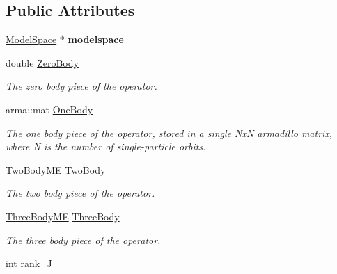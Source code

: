 \subsection*{Public Attributes}
\begin{DoxyCompactItemize}
\item 
\hypertarget{classOperator_af08ef1c6d3ef38d08b4a6ea20b26ef22}{\hyperlink{classModelSpace}{Model\-Space} $\ast$ {\bfseries modelspace}}\label{classOperator_af08ef1c6d3ef38d08b4a6ea20b26ef22}

\item 
\hypertarget{classOperator_a2f9f1109333a2485083cc7c090f9cd26}{double \hyperlink{classOperator_a2f9f1109333a2485083cc7c090f9cd26}{Zero\-Body}}\label{classOperator_a2f9f1109333a2485083cc7c090f9cd26}

\begin{DoxyCompactList}\small\item\em The zero body piece of the operator. \end{DoxyCompactList}\item 
\hypertarget{classOperator_a14b1c78e0be45772aa57168c74d1b57c}{arma\-::mat \hyperlink{classOperator_a14b1c78e0be45772aa57168c74d1b57c}{One\-Body}}\label{classOperator_a14b1c78e0be45772aa57168c74d1b57c}

\begin{DoxyCompactList}\small\item\em The one body piece of the operator, stored in a single Nx\-N armadillo matrix, where N is the number of single-\/particle orbits. \end{DoxyCompactList}\item 
\hypertarget{classOperator_add51ac69970faff9936192fec4181e00}{\hyperlink{classTwoBodyME}{Two\-Body\-M\-E} \hyperlink{classOperator_add51ac69970faff9936192fec4181e00}{Two\-Body}}\label{classOperator_add51ac69970faff9936192fec4181e00}

\begin{DoxyCompactList}\small\item\em The two body piece of the operator. \end{DoxyCompactList}\item 
\hypertarget{classOperator_ac9d7e28ec1958d5065e12cbf0c0e3541}{\hyperlink{classThreeBodyME}{Three\-Body\-M\-E} \hyperlink{classOperator_ac9d7e28ec1958d5065e12cbf0c0e3541}{Three\-Body}}\label{classOperator_ac9d7e28ec1958d5065e12cbf0c0e3541}

\begin{DoxyCompactList}\small\item\em The three body piece of the operator. \end{DoxyCompactList}\item 
\hypertarget{classOperator_a71a7c194800e2758c42ad0d5f30299aa}{int \hyperlink{classOperator_a71a7c194800e2758c42ad0d5f30299aa}{rank\-\_\-\-J}}\label{classOperator_a71a7c194800e2758c42ad0d5f30299aa}


\end{DoxyCompactItemize}
